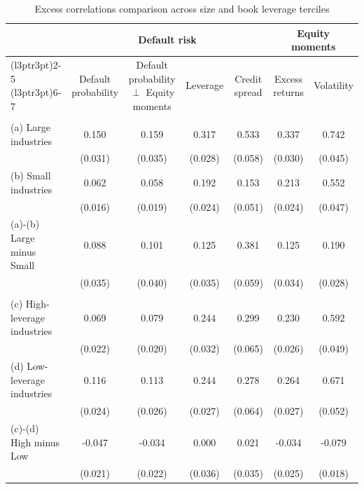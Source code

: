 \begin{table}

\caption{\label{tab:table-oa9}Excess correlations comparison across size and book leverage terciles}
\centering
\begin{tabular}[t]{lcccccc}
\toprule
\multicolumn{1}{c}{ } & \multicolumn{4}{c}{Default risk} & \multicolumn{2}{c}{Equity moments} \\
\cmidrule(l{3pt}r{3pt}){2-5} \cmidrule(l{3pt}r{3pt}){6-7}
  & Default probability & Default probability $\perp$ Equity moments & Leverage & Credit spread & Excess returns & Volatility\\
\midrule
\addlinespace[0.3em]
\multicolumn{7}{l}{\textbf{Panel A: Excess Correlation by Industry Size}}\\
\hspace{1em}(a) Large industries & 0.150 & 0.159 & 0.317 & 0.533 & 0.337 & 0.742\\
\hspace{1em} & (0.031) & (0.035) & (0.028) & (0.058) & (0.030) & (0.045)\\
\hspace{1em}(b) Small industries & 0.062 & 0.058 & 0.192 & 0.153 & 0.213 & 0.552\\
\hspace{1em} & (0.016) & (0.019) & (0.024) & (0.051) & (0.024) & (0.047)\\
\hspace{1em}(a)-(b) Large minus Small & 0.088 & 0.101 & 0.125 & 0.381 & 0.125 & 0.190\\
\hspace{1em} & (0.035) & (0.040) & (0.035) & (0.059) & (0.034) & (0.028)\\
\addlinespace[0.3em]
\multicolumn{7}{l}{\textbf{Panel B: Excess Correlation by Book Leverage}}\\
\hspace{1em}(c) High-leverage industries & 0.069 & 0.079 & 0.244 & 0.299 & 0.230 & 0.592\\
\hspace{1em} & (0.022) & (0.020) & (0.032) & (0.065) & (0.026) & (0.049)\\
\hspace{1em}(d) Low-leverage industries & 0.116 & 0.113 & 0.244 & 0.278 & 0.264 & 0.671\\
\hspace{1em} & (0.024) & (0.026) & (0.027) & (0.064) & (0.027) & (0.052)\\
\hspace{1em}(c)-(d) High minus Low & -0.047 & -0.034 & 0.000 & 0.021 & -0.034 & -0.079\\
\hspace{1em} & (0.021) & (0.022) & (0.036) & (0.035) & (0.025) & (0.018)\\
\bottomrule
\end{tabular}
\end{table}
